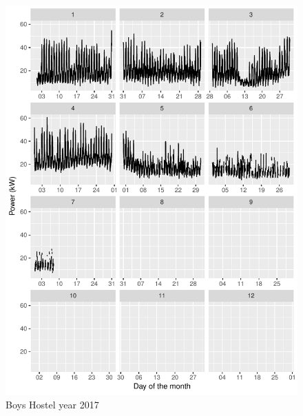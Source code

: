 \documentclass[11pt, oneside]{article}   	%
\begin{document}
\begin{figure}
\includegraphics[keepaspectratio]{boys_hostel_year2017.pdf}
\caption{Boys Hostel year 2017}
\end{figure}
\end{document}
